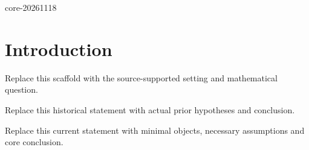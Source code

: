 \def\IntroExpectedRelease{core-20261118}

\ifdefined\IntroRelease
  \edef\IntroActualRelease{\IntroRelease}
  \ifx\IntroActualRelease\IntroExpectedRelease
  \else
    \PackageError{intro-v13}{Release mismatch}{Use the matching release.}
  \fi
\else
  \PackageError{intro-v13}{Missing profile release identity}{Use the matching release.}
\fi

\section{Introduction}
\begin{introparagraph}
Replace this scaffold with the source-supported setting and mathematical question.
\end{introparagraph}
\begin{historical}
Replace this historical statement with actual prior hypotheses and conclusion.
\end{historical}
\begin{resultgroup}
\begin{theorem}
Replace this current statement with minimal objects, necessary assumptions and core conclusion.
\end{theorem}
\end{resultgroup}
